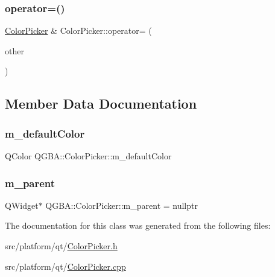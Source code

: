 \mbox{\label{class_q_g_b_a_1_1_color_picker_a4459c0f48bf42c5a672b3fdf71853639}} 
\subsubsection{\texorpdfstring{operator=()}{operator=()}}
{\footnotesize\ttfamily \mbox{\hyperlink{class_q_g_b_a_1_1_color_picker}{Color\+Picker}} \& Color\+Picker\+::operator= (\begin{DoxyParamCaption}\item[{const \mbox{\hyperlink{class_q_g_b_a_1_1_color_picker}{Color\+Picker}} \&}]{other }\end{DoxyParamCaption})}



\subsection{Member Data Documentation}
\mbox{\label{class_q_g_b_a_1_1_color_picker_a40fbcbeebb0811f96489d9f729f3ceae}} 
\subsubsection{\texorpdfstring{m\+\_\+default\+Color}{m\_defaultColor}}
{\footnotesize\ttfamily Q\+Color Q\+G\+B\+A\+::\+Color\+Picker\+::m\+\_\+default\+Color\hspace{0.3cm}{\ttfamily [private]}}

\mbox{\label{class_q_g_b_a_1_1_color_picker_a2e858b88d7606a43d17cb760bd080cdf}} 
\subsubsection{\texorpdfstring{m\+\_\+parent}{m\_parent}}
{\footnotesize\ttfamily Q\+Widget$\ast$ Q\+G\+B\+A\+::\+Color\+Picker\+::m\+\_\+parent = nullptr\hspace{0.3cm}{\ttfamily [private]}}



The documentation for this class was generated from the following files\+:\begin{DoxyCompactItemize}
\item 
src/platform/qt/\mbox{\hyperlink{_color_picker_8h}{Color\+Picker.\+h}}\item 
src/platform/qt/\mbox{\hyperlink{_color_picker_8cpp}{Color\+Picker.\+cpp}}\end{DoxyCompactItemize}

